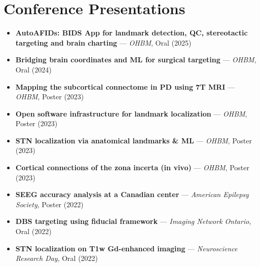 \section*{Conference Presentations} \sectionline
\begin{itemize}
  \item \textbf{AutoAFIDs: BIDS App for landmark detection, QC, stereotactic targeting and brain charting} — \textit{OHBM}, Oral (2025)
  \item \textbf{Bridging brain coordinates and ML for surgical targeting} — \textit{OHBM}, Oral (2024)
  \item \textbf{Mapping the subcortical connectome in PD using 7T MRI} — \textit{OHBM}, Poster (2023)
  \item \textbf{Open software infrastructure for landmark localization} — \textit{OHBM}, Poster (2023)
  \item \textbf{STN localization via anatomical landmarks \& ML} — \textit{OHBM}, Poster (2023)
  \item \textbf{Cortical connections of the zona incerta (in vivo)} — \textit{OHBM}, Poster (2023)
  \item \textbf{SEEG accuracy analysis at a Canadian center} — \textit{American Epilepsy Society}, Poster (2022)
  \item \textbf{DBS targeting using fiducial framework} — \textit{Imaging Network Ontario}, Oral (2022)
  \item \textbf{STN localization on T1w Gd-enhanced imaging} — \textit{Neuroscience Research Day}, Oral (2022)
\end{itemize}
